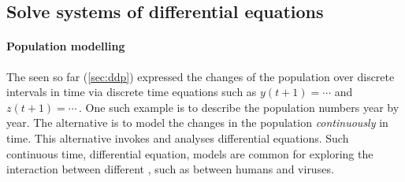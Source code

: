 




\subsection{Solve systems of differential equations}
\label{sec:ssde}

\paragraph{Population modelling}
The  seen so far (\autoref{sec:ddp}) expressed the changes of the population over discrete intervals in time via discrete time equations such as \(y(t+1)=\cdots\) and \(z(t+1)=\cdots\)\,.
One such example is to describe the population numbers year by year.
The alternative is to model the changes in the population \emph{continuously} in time.
This alternative invokes and analyses differential equations.
Such continuous time, differential equation, models are common for exploring the interaction between different , such as between humans and viruses.

